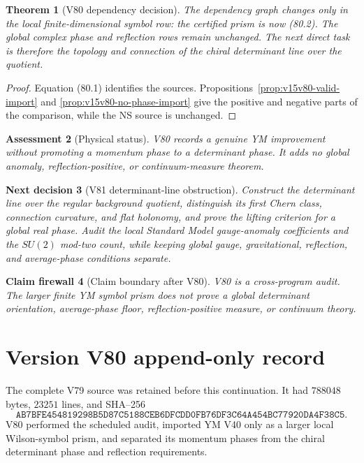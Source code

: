 \documentclass[11pt]{article}
\newtheorem{theorem}{Theorem}[section]
\newtheorem{firewall}[theorem]{Claim firewall}
\newtheorem{decision}[theorem]{Next decision}
\newtheorem{assessment}[theorem]{Assessment}
\theoremstyle{remark}
\begin{document}
\begin{theorem}[V80 dependency decision]
\label{thm:v15v80-decision}
The dependency graph changes only in the local finite-dimensional
symbol row: the certified prism is now (80.2).  The global complex
phase and reflection rows remain unchanged.  The next direct task
is therefore the topology and connection of the chiral determinant
line over the quotient.
\end{theorem}

\begin{proof}
Equation (80.1) identifies the sources.
Propositions~\ref{prop:v15v80-valid-import} and
\ref{prop:v15v80-no-phase-import} give the positive and negative
parts of the comparison, while the NS source is unchanged.
\end{proof}

\begin{assessment}[Physical status]
\label{ass:v15v80-status}
V80 records a genuine YM improvement without promoting a momentum
phase to a determinant phase.  It adds no global anomaly,
reflection-positive, or continuum-measure theorem.
\end{assessment}

\begin{decision}[V81 determinant-line obstruction]
\label{dec:v15v80-next}
Construct the determinant line over the regular background
quotient, distinguish its first Chern class, connection curvature,
and flat holonomy, and prove the lifting criterion for a global
real phase.  Audit the local Standard Model gauge-anomaly
coefficients and the \(SU(2)\) mod-two count, while keeping global
gauge, gravitational, reflection, and average-phase conditions
separate.
\end{decision}

\begin{firewall}[Claim boundary after V80]
\label{fire:v15v80}
V80 is a cross-program audit.  The larger finite YM symbol prism
does not prove a global determinant orientation, average-phase
floor, reflection-positive measure, or continuum theory.
\end{firewall}

\section*{Version V80 append-only record}
The complete V79 source was retained before this continuation.  It
had \(788048\) bytes, \(23251\) lines, and SHA--256
\[
 \texttt{AB7BFE454819298B5D87C5188CEB6DFCDD0FB76DF3C64A454BC77920DA4F38C5}.
\]
V80 performed the scheduled audit, imported YM V40 only as a
larger local Wilson-symbol prism, and separated its momentum phases
from the chiral determinant phase and reflection requirements.
\end{document}
